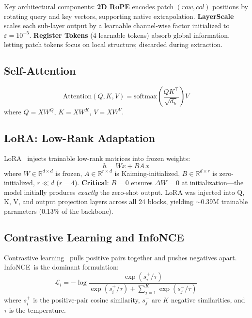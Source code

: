 \documentclass[11pt,a4paper]{article}
\newcommand{\infonce}{InfoNCE\ }
\begin{document}
Key architectural components: \textbf{2D RoPE} encodes patch $(row, col)$ positions by rotating query and key vectors, supporting native extrapolation. \textbf{LayerScale} scales each sub-layer output by a learnable channel-wise factor initialized to $\varepsilon = 10^{-5}$. \textbf{Register Tokens} (4 learnable tokens) absorb global information, letting patch tokens focus on local structure; discarded during extraction.

\subsection{Self-Attention}
\begin{equation}
\text{Attention}(Q, K, V) = \text{softmax}\!\left(\frac{QK^\top}{\sqrt{d_k}}\right)V
\end{equation}
where $Q = XW^Q$, $K = XW^K$, $V = XW^V$.

\subsection{LoRA: Low-Rank Adaptation}

LoRA~\cite{lora} injects trainable low-rank matrices into frozen weights:
\begin{equation}
h = Wx + BA\,x
\end{equation}
where $W \in \mathbb{R}^{d \times d}$ is frozen, $A \in \mathbb{R}^{r \times d}$ is Kaiming-initialized, $B \in \mathbb{R}^{d \times r}$ is zero-initialized, $r \ll d$ ($r=4$). \textbf{Critical}: $B=0$ ensures $\Delta W = 0$ at initialization---the model initially produces \emph{exactly} the zero-shot output. LoRA was injected into Q, K, V, and output projection layers across all 24 blocks, yielding $\sim$0.39M trainable parameters (0.13\% of the backbone).

\subsection{Contrastive Learning and InfoNCE}

Contrastive learning~\cite{cpc,simclr} pulls positive pairs together and pushes negatives apart. \infonce is the dominant formulation:
\begin{equation}
\mathcal{L}_i = -\log\frac{\exp(s_i^+ / \tau)}{\exp(s_i^+ / \tau) + \sum_{j=1}^{K} \exp(s_j^- / \tau)}
\end{equation}
where $s_i^+$ is the positive-pair cosine similarity, $s_j^-$ are $K$ negative similarities, and $\tau$ is the temperature.
\end{document}
